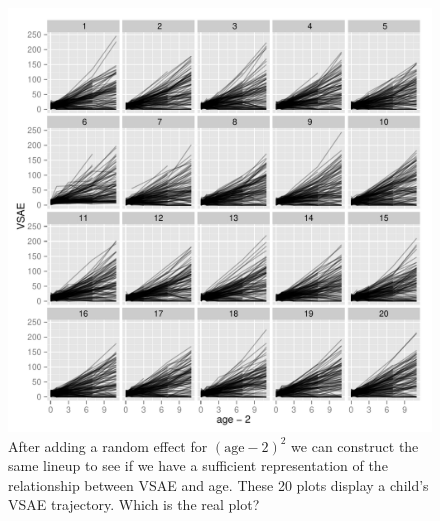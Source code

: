 \documentclass{article} %
\begin{document}
\begin{figure}
	\centering
	\includegraphics[width=\textwidth]{ranef2_lineup6.pdf}
	\caption{\label{fig:lineup-ranef2} After adding a random effect for $(\text{age} - 2)^2$ we can construct the same lineup to see if we have a sufficient representation of the relationship between VSAE and age. These 20 plots display a child's VSAE trajectory. Which is the real plot?}
\end{figure}
\end{document}
